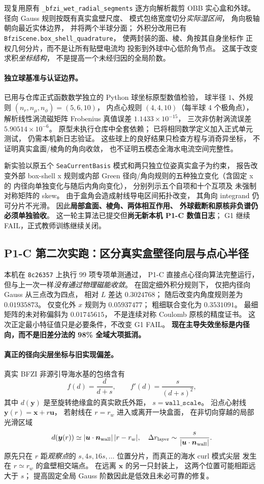 现复用原有
\texttt{\_bfzi\_wet\_radial\_segments}
逐方向解析裁剪 OBB 实心盒和外球。
径向 Gauss 规则按既有真实盒壁尺度、
模式包络宽度切分\emph{实际湿区间}，
角向极轴朝向最近实体边界，
并将两个半球分面；
外积分改用已有
\texttt{BfziScene.box\_shell\_quadrature}，
使两封装的面、棱、角按其自身坐标作
正权几何分片，而不是让所有贴壁电流均
投影到外球中心低阶角节点。
这属于改变求积\emph{坐标结构}，
不是提高一个未经归因的全局阶数。

\paragraph{独立球基准与认证边界。}
已用与仓库正式函数数学独立的
Python 球坐标原型数值检验，
球半径 $1$、外规则
$(n_r,n_\mu,n_\phi)=(5,6,10)$，
内点心规则 $(4,4,10)$（每半球 4 个极角点），
解析线性涡流磁矩阵 Frobenius 真值误差
$1.1433\times10^{-15}$，
三次非仿射涡流误差
$5.90514\times10^{-6}$。
原型未执行仓库中全套依赖；
已将相同数学定义加入正式单元测试，
仍需本机新日志验证。
这些球上的良好结果只检查方程与消奇异坐标，
不证明真实盒面/棱角的角向收敛，
也不证明五模态全海水电流空间完整性。

新实验以原五个 \texttt{SeaCurrentBasis}
模式和两只独立位姿真实盒子为约束，
报告改变外部 box-shell x 规则或内部 Green
径向/角向规则的五种独立变化（含固定 x 的
内径向单独变化与随后内角向变化），
分别列示五个自项和十个互项及
未强制对称矩阵的 skew。
由于盒角会造成射线导电区间拓扑改变，
其角向 integrand 仍可分片不光滑。
因此\textbf{局部盒面、棱角、两体相互作用、
外球截断和原核非负谱仍必须单独验收}。
这一轮主算法已提交但\textbf{尚无新本机 P1-C 数值日志}；
G1 继续 FAIL，正式教师训练继续关闭。


\subsection{P1-C 第二次实跑：区分真实盒壁径向层与点心半径}
\label{sec:p1-wall-ray-anchoring}
本机在 \texttt{8c26357} 上执行 99 项专项单测通过，
P1-C 直接点心径向算法完整运行，
但与上一次一样\emph{没有通过物理磁能收敛}。
在固定细外积分规则下，
仅把内径向 Gauss 从三点改为四点，
相对 $L$ 差达 $0.3024768$；
随后改变内角度规则差为 $0.01935873$。
仅变化外 $x$ 规则为 $0.05937477$；
粗细联合变化为 $0.3531091$。
最细矩阵的未对称偏斜为 $0.01745615$，
不是连续对称 Coulomb 原核的精度证书。
这次正定最小特征值只是必要条件，不改变 G1 FAIL。
\textbf{现在主导失效坐标是内径向，而不是旧差分法的
98\% 全域大项抵消。}

\paragraph{真正的径向尖层坐标与旧实现偏差。}
真实 BFZI 非源引导海水基的包络含有
\[
 f(d)=\frac{d}{d+s},
 \qquad f'(d)=\frac{s}{(d+s)^2},
\]
其中 $d(\bm y)$ 是至旋转绝缘盒的真实欧氏外距，
$s=\texttt{wall\_scale}$。
沿点心射线 $\bm y(r)=\bm x+r\bm u$，
若射线在 $r=r_w$ 进入或离开一块盒面，
在非切向穿越的局部光滑区域
\[
 d(\bm y(r))
 \simeq |\bm u\cdot\bm n_{\rm wall}|\,|r-r_w|,
 \quad
 \Delta r_{\rm layer}\sim
 \frac{s}{|\bm u\cdot\bm n_{\rm wall}|}.
\]
原先只在 $r$ 距\emph{观察点}的 $s,4s,16s,\ldots$
位置分片，而真正的海水 curl 模式尖层
发生在 $r\simeq r_w$ 的盒壁相交端点。
在远离 $\bm x$ 的另一只封装上，
这两个位置可能相距远大于 $s$；
提高固定全局 Gauss 阶数因此是低效且未必可靠的修复。

